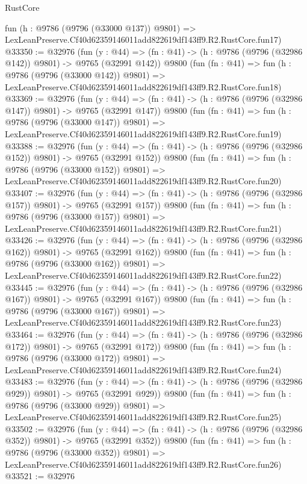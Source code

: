 \begin{lexlean}{RustCore}
\begin{coremodule}
    fun (h : @9786 (@9796 (@33000 @137)) @9801) =>
    LexLeanPreserve.Cf40d62359146011add822619df143ff9.R2.RustCore.fun17)
@33350 := @32976
    (fun (y : @44) => (fn : @41) -> (h : @9786 (@9796 (@32986 @142)) @9801) -> @9765 (@32991 @142))
    @9800
    (fun (fn : @41) =>
    fun (h : @9786 (@9796 (@33000 @142)) @9801) =>
    LexLeanPreserve.Cf40d62359146011add822619df143ff9.R2.RustCore.fun18)
@33369 := @32976
    (fun (y : @44) => (fn : @41) -> (h : @9786 (@9796 (@32986 @147)) @9801) -> @9765 (@32991 @147))
    @9800
    (fun (fn : @41) =>
    fun (h : @9786 (@9796 (@33000 @147)) @9801) =>
    LexLeanPreserve.Cf40d62359146011add822619df143ff9.R2.RustCore.fun19)
@33388 := @32976
    (fun (y : @44) => (fn : @41) -> (h : @9786 (@9796 (@32986 @152)) @9801) -> @9765 (@32991 @152))
    @9800
    (fun (fn : @41) =>
    fun (h : @9786 (@9796 (@33000 @152)) @9801) =>
    LexLeanPreserve.Cf40d62359146011add822619df143ff9.R2.RustCore.fun20)
@33407 := @32976
    (fun (y : @44) => (fn : @41) -> (h : @9786 (@9796 (@32986 @157)) @9801) -> @9765 (@32991 @157))
    @9800
    (fun (fn : @41) =>
    fun (h : @9786 (@9796 (@33000 @157)) @9801) =>
    LexLeanPreserve.Cf40d62359146011add822619df143ff9.R2.RustCore.fun21)
@33426 := @32976
    (fun (y : @44) => (fn : @41) -> (h : @9786 (@9796 (@32986 @162)) @9801) -> @9765 (@32991 @162))
    @9800
    (fun (fn : @41) =>
    fun (h : @9786 (@9796 (@33000 @162)) @9801) =>
    LexLeanPreserve.Cf40d62359146011add822619df143ff9.R2.RustCore.fun22)
@33445 := @32976
    (fun (y : @44) => (fn : @41) -> (h : @9786 (@9796 (@32986 @167)) @9801) -> @9765 (@32991 @167))
    @9800
    (fun (fn : @41) =>
    fun (h : @9786 (@9796 (@33000 @167)) @9801) =>
    LexLeanPreserve.Cf40d62359146011add822619df143ff9.R2.RustCore.fun23)
@33464 := @32976
    (fun (y : @44) => (fn : @41) -> (h : @9786 (@9796 (@32986 @172)) @9801) -> @9765 (@32991 @172))
    @9800
    (fun (fn : @41) =>
    fun (h : @9786 (@9796 (@33000 @172)) @9801) =>
    LexLeanPreserve.Cf40d62359146011add822619df143ff9.R2.RustCore.fun24)
@33483 := @32976
    (fun (y : @44) => (fn : @41) -> (h : @9786 (@9796 (@32986 @929)) @9801) -> @9765 (@32991 @929))
    @9800
    (fun (fn : @41) =>
    fun (h : @9786 (@9796 (@33000 @929)) @9801) =>
    LexLeanPreserve.Cf40d62359146011add822619df143ff9.R2.RustCore.fun25)
@33502 := @32976
    (fun (y : @44) => (fn : @41) -> (h : @9786 (@9796 (@32986 @352)) @9801) -> @9765 (@32991 @352))
    @9800
    (fun (fn : @41) =>
    fun (h : @9786 (@9796 (@33000 @352)) @9801) =>
    LexLeanPreserve.Cf40d62359146011add822619df143ff9.R2.RustCore.fun26)
@33521 := @32976

\end{coremodule}
\end{lexlean}
